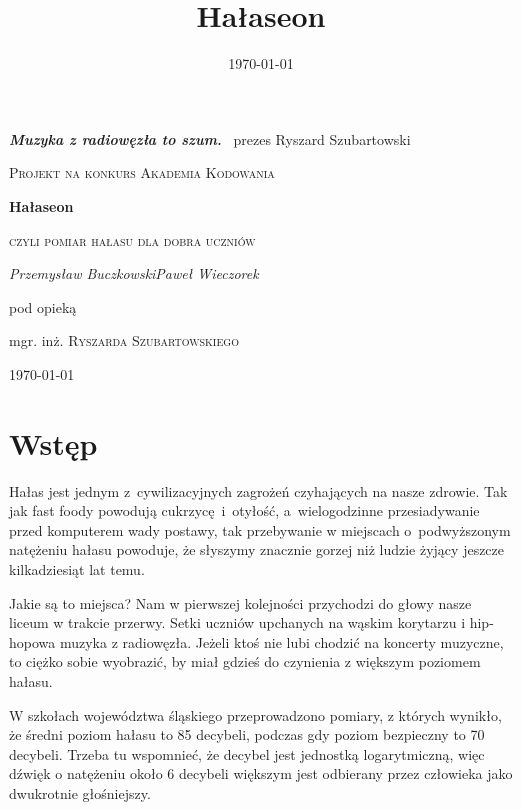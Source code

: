 \documentclass[12pt, a4paper]{article}
\title{Hałaseon}
\date{\today}
\begin{document}
\begin{titlepage}
	\begin{flushright}
	{\large \color{Goldenrod} \emph{\textbf{Muzyka z radiowęzła to szum.}} \linebreak}
	~prezes Ryszard Szubartowski
	\end{flushright}
	\centering
	\vspace{1.5 cm}
	{\scshape Projekt na konkurs Akademia Kodowania\par}
	\vspace{1.5 cm}
	{\huge\bfseries Hałaseon\par}
	\vspace{0.1cm}
	{\scshape\Large czyli pomiar hałasu dla dobra uczniów\par}
	\vspace{2cm}
	{\Large\itshape Przemysław Buczkowski\linebreak Paweł Wieczorek\par}
	\vfill
	pod opieką\par
	mgr. inż. \textsc{Ryszarda Szubartowskiego}

	\vfill

	{\large \today\par}
\end{titlepage}

\tableofcontents

\vfill \pagebreak

\section{Wstęp}

Hałas jest jednym z~cywilizacyjnych zagrożeń czyhających na nasze zdrowie. Tak jak fast foody powodują cukrzycę~i~otyłość, a~wielogodzinne przesiadywanie przed komputerem wady postawy, tak przebywanie w miejscach o~podwyższonym natężeniu hałasu powoduje, że słyszymy znacznie gorzej niż ludzie żyjący jeszcze kilkadziesiąt lat temu.

Jakie są to miejsca? Nam w pierwszej kolejności przychodzi do głowy nasze liceum w trakcie przerwy. Setki uczniów upchanych na wąskim korytarzu i hip-hopowa muzyka z radiowęzła. Jeżeli ktoś nie lubi chodzić na koncerty muzyczne, to ciężko sobie wyobrazić, by miał gdzieś do czynienia z większym poziomem hałasu.

W szkołach województwa śląskiego przeprowadzono pomiary, z których wynikło, że średni poziom hałasu to 85 decybeli\cite{dz}, podczas gdy poziom bezpieczny to 70 decybeli\cite{wikihalas}. Trzeba tu wspomnieć, że decybel jest jednostką logarytmiczną, więc dźwięk o natężeniu około 6 decybeli większym jest odbierany przez człowieka jako dwukrotnie głośniejszy.
\end{document}
